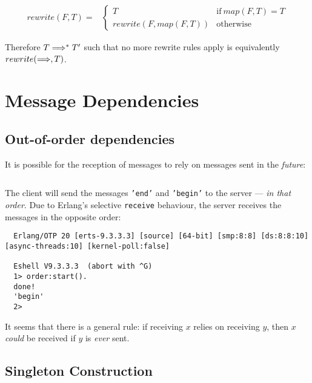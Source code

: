 \documentclass[nonacm,timestamp,manuscript]{acmart}
\begin{document}
\begin{align*}
  rewrite(F, T) ={}&
                     \begin{cases}
                       T & \text{if}\ map(F, T) = T \\
                       rewrite(F, map(F, T)) & \text{otherwise}
                     \end{cases}
\end{align*}

Therefore $T \Longrightarrow^{*} T^{\prime}$ such that no more rewrite rules apply is
equivalently $rewrite(\Longrightarrow, T)$.


\section{Message Dependencies}

\subsection{Out-of-order dependencies}

It is possible for the reception of messages to rely on messages sent in the
\textit{future}:

\inputminted{erlang}{order.erl}

The client will send the messages \texttt{'end'} and \texttt{'begin'} to the
server --- \textit{in that order}. Due to Erlang's selective \texttt{receive}
behaviour, the server receives the messages in the opposite order:

\begin{verbatim}
  Erlang/OTP 20 [erts-9.3.3.3] [source] [64-bit] [smp:8:8] [ds:8:8:10] [async-threads:10] [kernel-poll:false]

  Eshell V9.3.3.3  (abort with ^G)
  1> order:start().
  done!
  'begin'
  2>
\end{verbatim}

It seems that there is a general rule: if receiving $x$ relies on receiving $y$,
then $x$ \textit{could} be received if $y$ is \textit{ever} sent.

\subsection{Singleton Construction}
\end{document}
